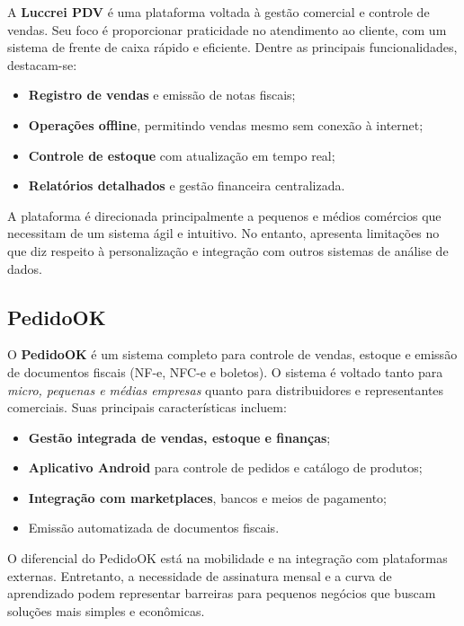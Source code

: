 A \textbf{Luccrei PDV} é uma plataforma voltada à gestão comercial e controle de vendas. Seu foco é proporcionar praticidade no atendimento ao cliente, com um sistema de frente de caixa rápido e eficiente. Dentre as principais funcionalidades, destacam-se:

\begin{itemize}
    \item \textbf{Registro de vendas} e emissão de notas fiscais;
    \item \textbf{Operações offline}, permitindo vendas mesmo sem conexão à internet;
    \item \textbf{Controle de estoque} com atualização em tempo real;
    \item \textbf{Relatórios detalhados} e gestão financeira centralizada.
\end{itemize}

A plataforma é direcionada principalmente a pequenos e médios comércios que necessitam de um sistema ágil e intuitivo. No entanto, apresenta limitações no que diz respeito à personalização e integração com outros sistemas de análise de dados.

\subsection{PedidoOK}

O \textbf{PedidoOK} é um sistema completo para controle de vendas, estoque e emissão de documentos fiscais (NF-e, NFC-e e boletos). O sistema é voltado tanto para \textit{micro, pequenas e médias empresas} quanto para distribuidores e representantes comerciais. Suas principais características incluem:

\begin{itemize}
    \item \textbf{Gestão integrada de vendas, estoque e finanças};
    \item \textbf{Aplicativo Android} para controle de pedidos e catálogo de produtos;
    \item \textbf{Integração com marketplaces}, bancos e meios de pagamento;
    \item Emissão automatizada de documentos fiscais.
\end{itemize}

O diferencial do PedidoOK está na mobilidade e na integração com plataformas externas. Entretanto, a necessidade de assinatura mensal e a curva de aprendizado podem representar barreiras para pequenos negócios que buscam soluções mais simples e econômicas.

